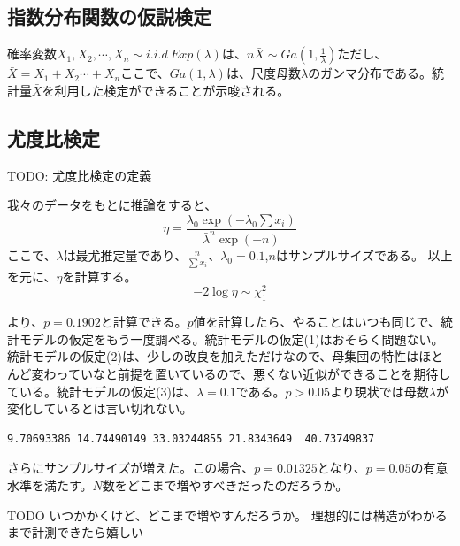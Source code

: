 \subsection{指数分布関数の仮説検定}
確率変数$X_1,X_2,\cdots,X_n \sim i.i.d \ Exp(\lambda)$は、$n\bar{X}\sim Ga(1,\frac{1}{\lambda}) $ただし、$\bar{X}=X_1+X_2 \cdots +X_n$ここで、$Ga(1,\lambda)$は、尺度母数$\lambda$のガンマ分布である。統計量$\bar{X}$を利用した検定ができることが示唆される。



\subsection{尤度比検定}
TODO: 尤度比検定の定義

我々のデータをもとに推論をすると、
$$
\eta= \frac{\lambda_0\exp\left({-\lambda_0\sum x_i}\right)}{\bar{\lambda}^n \exp{(-n)}}
$$
ここで、$\bar{\lambda}$は最尤推定量であり、$\frac{n}{\sum x_i}$、$\lambda_0=0.1$,$n$はサンプルサイズである。
以上を元に、$\eta$を計算する。
$$
-2\log \eta \sim \chi^2_1
$$

より、$p=0.1902$と計算できる。$p$値を計算したら、やることはいつも同じで、統計モデルの仮定をもう一度調べる。統計モデルの仮定(1)はおそらく問題ない。統計モデルの仮定(2)は、少しの改良を加えただけなので、母集団の特性はほとんど変わっていなと前提を置いているので、悪くない近似ができることを期待している。統計モデルの仮定(3)は、$\lambda=0.1$である。$p>0.05$より現状では母数$\lambda$が変化しているとは言い切れない。




\begin{lstlisting}
9.70693386 14.74490149 33.03244855 21.8343649  40.73749837
\end{lstlisting}


さらにサンプルサイズが増えた。この場合、$p=0.01325$となり、$p=0.05$の有意水準を満たす。$N$数をどこまで増やすべきだったのだろうか。

TODO いつかかくけど、どこまで増やすんだろうか。
理想的には構造がわかるまで計測できたら嬉しい



